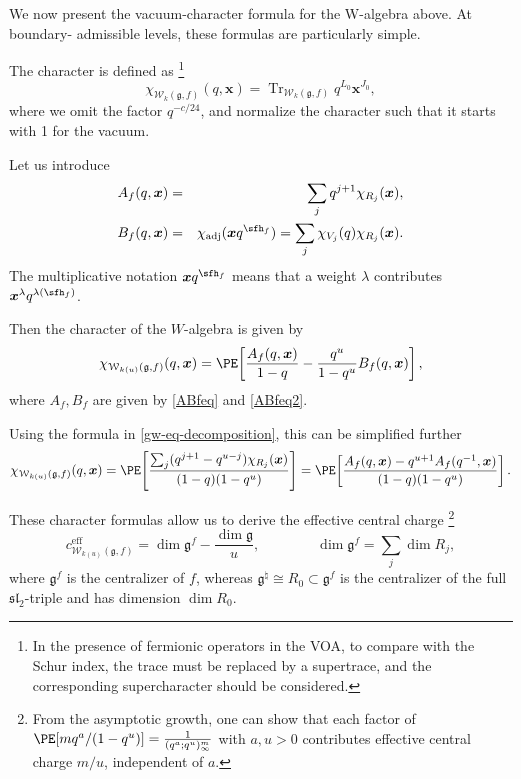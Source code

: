 \documentclass[a4paper,11pt]{article}
\theoremstyle{definition}
\theoremstyle{definition}
\theoremstyle{remark}
\newcommand{\ceff}{c^\text{eff}}
\newcommand{\be}{\begin{equation}}
\newcommand{\ee}{\end{equation}}
\newcommand{\beqn}{\begin{eqnarray}}
\newcommand{\eeqn}{\end{eqnarray}}
\begin{document}
 

 We now present the vacuum-character formula for the W-algebra above. At boundary-
admissible levels, these formulas are particularly simple.


The character is defined as \footnote{In the presence of fermionic operators in the VOA, to compare with the Schur index, the trace must be replaced by a supertrace, and the corresponding supercharacter should be considered.}
\be
 \chi_{\mathcal W_{k }(\mathfrak g,f)}(q,\bm x)
 =\operatorname{Tr}_{\mathcal W_{k }(\mathfrak g,f)} 
 q^{L_0}\bm x^{J_0},
 \label{gw-eq-normalized}
\ee
where  we  omit  the factor $q^{-c/24}$, and normalize the character such that it starts with 1 for the vacuum.  
 

Let us introduce
\beqn \label{ABfeq}
 A_f(q,\bm x) &=& \sum_jq^{j+1}\chi_{R_j}(\bm x), 
\\  \label{ABfeq2}
 B_f(q,\bm x) &=& \chi_{\mathrm{adj}}(\bm x q^{\sfh_f})
= \sum_j\chi_{V_j}(q)\chi_{R_j}(\bm x). 
\eeqn
%
The multiplicative notation $\bm x q^{\sfh_f}$ means that a weight
$\lambda$ contributes $\bm x^\lambda q^{\lambda(\sfh_f)}$.


Then the  character of the $W$-algebra is   given by  \cite[eq.~(36)]{Xie:2019zlb}
\be 
   \chi_{\mathcal W_{k(u) }(\mathfrak g,f)}(q,\bm x)
 =\PE\!\left[
 \frac{A_f(q,\bm x)}{1-q}
 -\frac{q^u}{1-q^u}B_f(q,\bm x)
 \right],
 \label{gw-eq-product}
\ee
where $A_f,B_f$ are given by  \eqref{ABfeq} and  \eqref{ABfeq2}.


 

  
Using the formula in \eqref{gw-eq-decomposition}, this  can be simplified further \cite[eq.~(39)]{Xie:2019zlb}  
\be 
 \chi_{ \mathcal W_{k(u)}(\mathfrak g,f)}(q,\bm x)
 =\PE\!\left[
 \frac{\sum_j(q^{j+1}-q^{u-j})\chi_{R_j}(\bm x)}
 {(1-q)(1-q^u)}\right]
  =\PE\!\left[
 \frac{A_f(q,\bm x) -q^{u +1}A_f(q^{-1},\bm x)}
 {(1-q)(1-q^u)}\right]. 
 \label{gw-eq-XY39}
\ee
 
These character formulas  allow  us to derive  the effective central charge
\footnote{From the asymptotic growth, one can show that each factor of  $\PE[m q^a/(1-q^u)] = \frac1{(q^a;q^u)^m_\infty}$ with $a,u>0$ contributes effective central charge $m/u $,   independent of $a$.
}
 \be
\ceff_{\mathcal W_{k(u) }(\mathfrak g,f)} = \dim\mathfrak g^f- \frac{\dim \mathfrak{g}}{u}, \qquad\qquad
\dim\mathfrak g^f=\sum_j\dim R_j ,
\ee 
  where $\mathfrak g^f $ is the centralizer of $f$, whereas $\mathfrak g^\natural\cong R_0\subset\mathfrak g^f$ is the centralizer of the full $\mathfrak{sl}_2$-triple and has dimension $\dim R_0$. 
 
\end{document}
